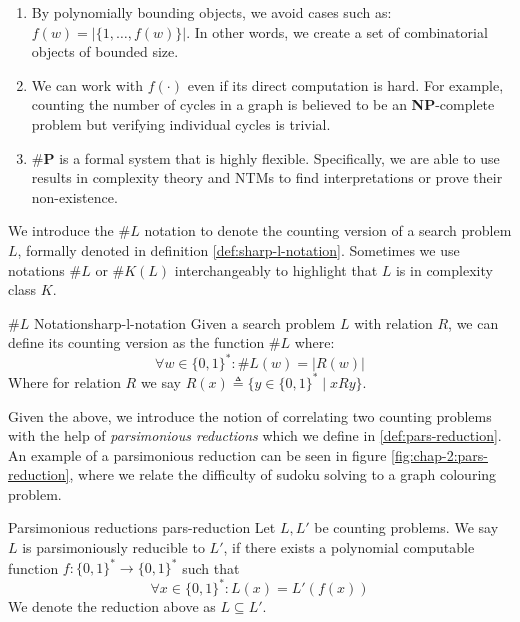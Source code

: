 \begin{enumerate}
    \item By polynomially bounding objects, we avoid cases such as: $f(w) = |\{1, \hdots, f(w)\}|$. In other words, we create a set
          of combinatorial objects of bounded size.
    \item We can work with $f(\cdot)$  even if its direct computation is hard. For example, counting
          the number of cycles in a graph is believed to be an \textbf{NP}-complete problem but verifying
          individual cycles is trivial.
    \item $\textbf{\#P}$ is a formal system that is highly flexible. Specifically, we are able to use
          results in complexity theory and NTMs to find interpretations or prove their non-existence.
\end{enumerate}

We introduce the $\#L$ notation to denote the counting version
of a search problem $L$, formally denoted in definition \ref{def:sharp-l-notation}.
Sometimes we use notations $\#L$ or $\#K(L)$ interchangeably to highlight
that $L$ is in complexity class $K$.

\begin{definitionbox}{$\#L$ Notation}{sharp-l-notation}
    Given a search problem $L$ with relation $R$, we can
    define its counting version as the function $\#L$ where:
    $$
        \forall w \in \{0,1\}^*: \#L(w) = |R(w)|
    $$
    Where for relation $R$ we say $R(x) \triangleq \{y \in \{0,1\}^* \mid xRy \}$.
\end{definitionbox}

Given the above, we introduce the notion of correlating two counting problems with the help of
\textit{parsimonious reductions} which we define in \ref{def:pars-reduction}.
An example of a parsimonious reduction can be seen in figure \ref{fig:chap-2:pars-reduction},
where we relate the difficulty of sudoku solving to a graph colouring problem.


\begin{definitionbox}{Parsimonious reductions \cite{arora_ComputationalComplexityModern_2009}}{pars-reduction}
    Let $L, L'$ be counting problems.
    We say $L$ is parsimoniously reducible to $L'$, if there exists a polynomial computable function $f: \{0,1\}^* \to \{0,1\}^*$
    such that
    $$
        \forall x \in \{0,1\}^*: L(x) = L'(f(x))
    $$
    We denote the reduction above as $L \subseteq L'$.
\end{definitionbox}


